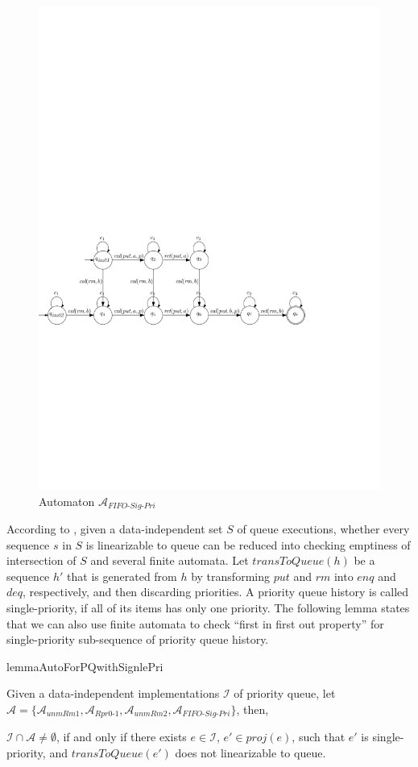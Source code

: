 \begin{figure}[htbp]
  \centering
  \includegraphics[width=0.8 \textwidth]{PIC_AUTO_QUEUE_FOR_SINGLE_PRI.pdf}
  \caption{Automaton $\mathcal{A}_{\textit{FIFO-Sig-Pri}}$}
  \label{fig:automata for FIFO of single priority}
\end{figure}

According to \cite{Bouajjani:2015}, given a data-independent set $S$ of queue executions, whether every sequence $s$ in $S$ is linearizable to queue can be reduced into checking emptiness of intersection of $S$ and several finite automata. Let $\textit{transToQueue}(h)$ be a sequence $h'$ that is generated from $h$ by transforming $\textit{put}$ and $\textit{rm}$ into $\textit{enq}$ and $\textit{deq}$, respectively, and then discarding priorities. A priority queue history is called single-priority, if all of its items has only one priority. The following lemma states that we can also use finite automata to check ``first in first out property'' for single-priority sub-sequence of priority queue history.

\begin{restatable}{lemma}{AutoForPQwithSignlePri}
\label{lemma:automata for priority queue with single priority}

Given a data-independent implementations $\mathcal{I}$ of priority queue, let $\mathcal{A} = \{ \mathcal{A}_{\textit{unmRm1}}, \mathcal{A}_{\textit{Rpr0-1}}, \mathcal{A}_{\textit{unmRm2}}, \mathcal{A}_{\textit{FIFO-Sig-Pri}} \}$, then,

$\mathcal{I} \cap \mathcal{A} \neq \emptyset$, if and only if there exists $e \in \mathcal{I}$, $e' \in \textit{proj}(e)$, such that $e'$ is single-priority, and $\textit{transToQueue}(e')$ does not linearizable to queue.
\end{restatable}

